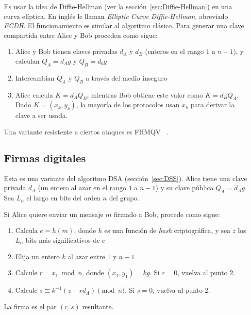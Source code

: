   Es usar la idea de Diffie-Hellman
  (ver la sección~\ref{sec:Diffie-Hellman})
  en una curva elíptica.
  En inglés
  le llaman
   \emph{\foreignlanguage{english}{Elliptic Curve Diffie-Hellman}},
  abreviado \emph{ECDH}.
  El funcionamiento es similar al algoritmo clásico.
  Para generar una clave compartida
  entre \foreignlanguage{english}{Alice}
  y \foreignlanguage{english}{Bob}
  proceden como sigue:
  \begin{enumerate}
  \item
    \foreignlanguage{english}{Alice}
    y \foreignlanguage{english}{Bob} tienen
    claves privadas \(d_A\) y \(d_B\)
    (enteros en el rango \(1\) a \(n - 1\)),
    y calculan \(Q_A = d_A g\) y \(Q_B = d_b g\)
  \item
    Intercambian \(Q_A\) y \(Q_B\) a través del medio inseguro
  \item
    \foreignlanguage{english}{Alice} calcula \(K = d_A Q_B\),
    mientras \foreignlanguage{english}{Bob}
    obtiene este valor como \(K = d_B Q_A\).
    Dado \(K = (x_k, y_k)\),
    la mayoría de los protocolos
    usan \(x_k\) para derivar la clave a ser usada.
  \end{enumerate}

  Una variante resistente a ciertos ataques es FHMQV~%
    \cite{cryptoeprint:2009:408}.

\subsection{Firmas digitales}
\label{sec:ECDSA}

  Esta es una variante del algoritmo DSA
  (sección~\ref{sec:DSS}).
  \foreignlanguage{english}{Alice} tiene una clave privada \(d_A\)
  (un entero al azar en el rango \(1\) a \(n - 1\))
  y su clave pública \(Q_A = d_A g\).
  Sea \(L_n\) el largo en bits del orden \(n\) del grupo.

  Si \foreignlanguage{english}{Alice}
  quiere enviar un mensaje \(m\)
  firmado a \foreignlanguage{english}{Bob},
  procede como sigue:
  \begin{enumerate}
  \item
    Calcula \(e = h(m)\),
    donde \(h\)
    es una función de \emph{\foreignlanguage{english}{hash}} criptográfica,
    y sea \(z\) los \(L_n\) bits más significativos de \(e\)
  \item
    Elija un entero \(k\) al azar entre \(1\) y \(n - 1\)
  \item
    Calcule \(r = x_1 \bmod n\),
    donde \((x_1, y_1) = k g\).
    Si \(r = 0\),
    vuelva al punto 2.
  \item
    Calcule \(s \equiv k^{-1}(z + r d_A) \pmod{n}\).
    Si \(s = 0\),
    vuelva al punto 2.
  \end{enumerate}
  La firma es el par \((r, s)\) resultante.

